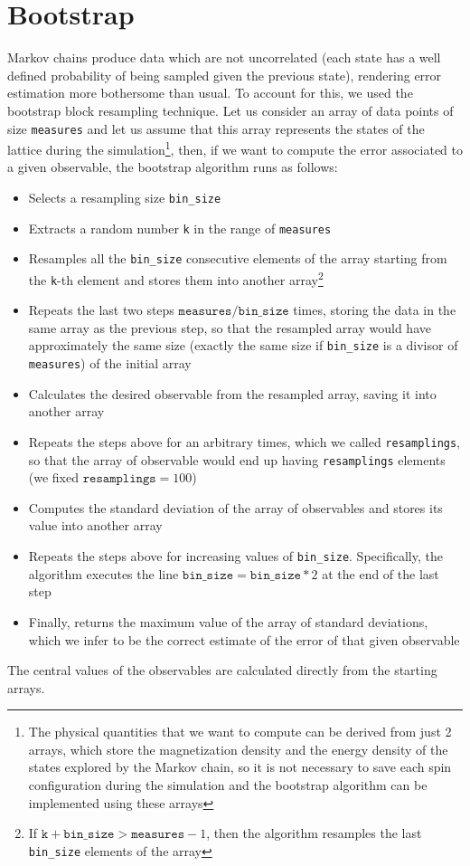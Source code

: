 \documentclass[11pt]{scrartcl} %
\begin{document}
\section{Bootstrap}
\label{bootstrap}
Markov chains produce data which are not uncorrelated (each state has a well defined probability of being sampled given the previous state), rendering error estimation more bothersome than usual. To account for this, we used the bootstrap block resampling technique. Let us consider an array of data points of size \texttt{measures} and let us assume that this array represents the states of the lattice during the simulation\footnote{The physical quantities that we want to compute can be derived from just 2 arrays, which store the magnetization density and the energy density of the states explored by the Markov chain, so it is not necessary to save each spin configuration during the simulation and the bootstrap algorithm can be implemented using these arrays}, then, if we want to compute the error associated to a given observable, the bootstrap algorithm runs as follows:
\begin{itemize}
	\item Selects a resampling size \texttt{bin{\_}size}
	\item Extracts a random number \texttt{k} in the range of \texttt{measures}
	\item Resamples all the \texttt{bin{\_}size} consecutive elements of the array starting from the \texttt{k}-th element and stores them into another array\footnote{If $\mathtt{k}+\mathtt{bin{\_}size} > \mathtt{measures}-1$, then the algorithm resamples the last \texttt{bin{\_}size} elements of the array}
	\item Repeats the last two steps $\mathtt{measures}/\mathtt{bin{\_}size}$ times, storing the data in the same array as the previous step, so that the resampled array would have approximately the same size (exactly the same size if \texttt{bin{\_}size} is a divisor of \texttt{measures}) of the initial array
	\item Calculates the desired observable from the resampled array, saving it into another array
	\item Repeats the steps above for an arbitrary times, which we called \texttt{resamplings}, so that the array of observable would end up having \texttt{resamplings} elements (we fixed $\mathtt{resamplings}=100$)
	\item Computes the standard deviation of the array of observables and stores its value into another array
	\item Repeats the steps above for increasing values of \texttt{bin{\_}size}. Specifically, the algorithm executes the line $\mathtt{bin{\_}size} = \mathtt{bin{\_}size}*2$ at the end of the last step
	\item Finally, returns the maximum value of the array of standard deviations, which we infer to be the correct estimate of the error of that given observable
\end{itemize}
The central values of the observables are calculated directly from the starting arrays.
\end{document}
